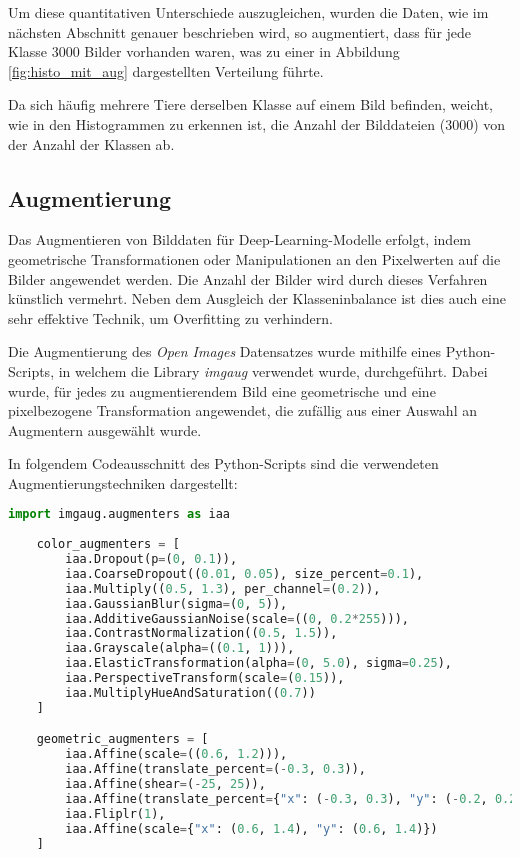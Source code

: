 Um diese quantitativen Unterschiede auszugleichen,
wurden die Daten, wie im nächsten
Abschnitt genauer beschrieben wird, so augmentiert, 
dass für jede Klasse 3000 Bilder vorhanden waren,
was zu einer in Abbildung \ref{fig:histo_mit_aug} 
dargestellten Verteilung führte.

Da sich häufig mehrere Tiere derselben Klasse 
auf einem Bild befinden, weicht, wie in den Histogrammen 
zu erkennen ist, die Anzahl der Bilddateien (3000) von 
der Anzahl der Klassen ab.



\subsection{Augmentierung}\label{subsec:augmentation}

Das Augmentieren von Bilddaten für Deep-Learning-Modelle
erfolgt, indem geometrische Transformationen oder Manipulationen 
an den Pixelwerten auf die Bilder angewendet werden.
Die Anzahl der Bilder wird durch dieses Verfahren 
künstlich vermehrt.
Neben dem Ausgleich der Klasseninbalance ist dies 
auch eine sehr effektive Technik, um
Overfitting zu verhindern.

Die Augmentierung des \textit{Open Images} Datensatzes 
wurde mithilfe eines Python-Scripts, in welchem die Library 
\textit{imgaug} \cite{imgaug} verwendet wurde, durchgeführt.
Dabei wurde, für jedes zu augmentierendem Bild eine geometrische und 
eine pixelbezogene Transformation angewendet, die 
zufällig aus einer Auswahl an Augmentern ausgewählt wurde.

In folgendem Codeausschnitt des Python-Scripts sind die 
verwendeten Augmentierungstechniken dargestellt:

\begin{lstlisting}[language=Python]
    import imgaug.augmenters as iaa
    
    color_augmenters = [
        iaa.Dropout(p=(0, 0.1)),
        iaa.CoarseDropout((0.01, 0.05), size_percent=0.1),
        iaa.Multiply((0.5, 1.3), per_channel=(0.2)),
        iaa.GaussianBlur(sigma=(0, 5)),
        iaa.AdditiveGaussianNoise(scale=((0, 0.2*255))),
        iaa.ContrastNormalization((0.5, 1.5)),
        iaa.Grayscale(alpha=((0.1, 1))),
        iaa.ElasticTransformation(alpha=(0, 5.0), sigma=0.25),
        iaa.PerspectiveTransform(scale=(0.15)),
        iaa.MultiplyHueAndSaturation((0.7))
    ]

    geometric_augmenters = [
        iaa.Affine(scale=((0.6, 1.2))),
        iaa.Affine(translate_percent=(-0.3, 0.3)),
        iaa.Affine(shear=(-25, 25)),
        iaa.Affine(translate_percent={"x": (-0.3, 0.3), "y": (-0.2, 0.2)}),
        iaa.Fliplr(1),
        iaa.Affine(scale={"x": (0.6, 1.4), "y": (0.6, 1.4)})
    ]
    
\end{lstlisting}

